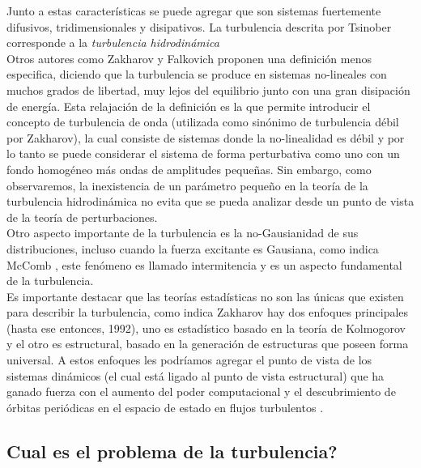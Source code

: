 \documentclass[executivepaper,12pt]{article}
\numberwithin{equation}{section}
\begin{document}
Junto a estas características se puede agregar que son sistemas fuertemente difusivos, tridimensionales y disipativos. La turbulencia descrita por Tsinober corresponde a la \textit{turbulencia hidrodinámica}\\
Otros autores como Zakharov y Falkovich \parencite{zakharov2012, cardy2008} proponen una definición menos especifica, diciendo que la turbulencia se produce en sistemas no-lineales con muchos grados de libertad, muy lejos del equilibrio junto con una gran disipación de energía. Esta relajación de la definición es la que permite introducir el concepto de turbulencia de onda (utilizada como sinónimo de turbulencia débil por Zakharov), la cual consiste de sistemas donde la no-linealidad es débil y por lo tanto se puede considerar el sistema de forma perturbativa como uno con un fondo homogéneo más ondas de amplitudes pequeñas. Sin embargo, como observaremos, la inexistencia de un parámetro pequeño en la teoría de la turbulencia hidrodinámica no evita que se pueda analizar desde un punto de vista de la teoría de perturbaciones.    \\
Otro aspecto importante de la turbulencia es la no-Gausianidad de sus distribuciones, incluso cuando la fuerza excitante es Gausiana, como indica McComb \parencite{mccomb2014}, este fenómeno es llamado intermitencia y es un aspecto fundamental de la turbulencia.\\
Es importante destacar que las teorías estadísticas no son las únicas que existen para describir la turbulencia, como indica Zakharov \parencite{zakharov2012} hay dos enfoques principales (hasta ese entonces, 1992), uno es estadístico basado en la teoría de Kolmogorov y el otro es estructural, basado en la generación de estructuras que poseen forma universal. A estos enfoques les podríamos agregar el punto de vista de los sistemas dinámicos (el cual está ligado al punto de vista estructural) que ha ganado fuerza con el aumento del poder computacional y el descubrimiento de órbitas periódicas en el espacio de estado en flujos turbulentos \parencite{cvitanovic2013}.    

\subsection{Cual es el problema de la turbulencia?}
\end{document}
